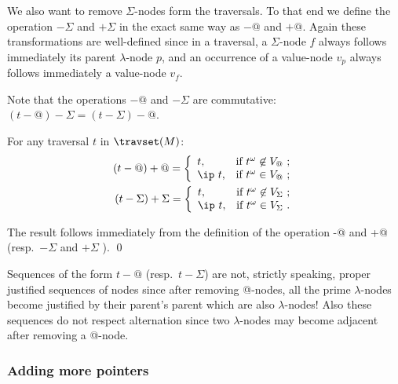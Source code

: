 We also want to remove $\Sigma$-nodes form the traversals. To that end we define the operation $-\Sigma$ and $+\Sigma$ in the exact same way as $-@$ and $+@$. Again these transformations are well-defined since in a traversal, a $\Sigma$-node $f$ always follows immediately its parent $\lambda$-node $p$, and an occurrence of a value-node $v_p$ always follows immediately a value-node $v_f$.

Note that the operations $-@$ and $-\Sigma$ are commutative:
$(t-@)-\Sigma = (t-\Sigma)-@$.

\begin{lemma} \label{lem:minus_at_plus_at}
For any traversal $t$ in $\travset(M)$:
\begin{align*}
(t-@)+@ = \left\{
            \begin{array}{ll}
              t, & \hbox{if $t^\omega \not\in V_@$\ ;} \\
              \ip\ t, & \hbox{if $t^\omega \in V_@$\ ;}
            \end{array}
          \right.
\\
(t-\Sigma)+\Sigma = \left\{
            \begin{array}{ll}
              t, & \hbox{if $t^\omega \not\in V_\Sigma$\ ;} \\
              \ip\ t, & \hbox{if $t^\omega \in V_\Sigma$\ .}
            \end{array}
          \right.
\end{align*}
\end{lemma}
\proof The result follows immediately from the definition of the
operation -@ and +@ (resp.\ $-\Sigma$ and $+\Sigma$ ). \qed

\begin{remark}
Sequences of the form $t-@$ (resp.\ $t-\Sigma$) are not, strictly speaking, proper justified sequences of nodes since after removing @-nodes, all the prime $\lambda$-nodes become justified by their parent's parent which are also $\lambda$-nodes! Also these sequences do not respect alternation since two $\lambda$-nodes may become adjacent after removing a @-node.
\end{remark}


\subsubsection{Adding more pointers}
\label{sec:tstar}

